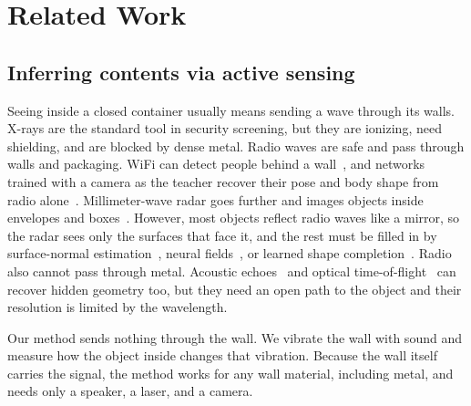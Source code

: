 
\section{Related Work}
\label{sec:related}

\subsection{Inferring contents via active sensing}
Seeing inside a closed container usually means sending a wave through its walls.
X-rays are the standard tool in security screening, but they are ionizing, need shielding, and are blocked by dense metal.
Radio waves are safe and pass through walls and packaging.
WiFi can detect people behind a wall~\cite{adib2013see}, and networks trained with a camera as the teacher recover their pose and body shape from radio alone~\cite{zhao2018rfpose,wang2019personinwifi,geng2022densepose}.
Millimeter-wave radar goes further and images objects inside envelopes and boxes~\cite{ganse2021envelopes,dodds2025mmnorm,lu2026geraf,dodds2025waveformer}.
However, most objects reflect radio waves like a mirror, so the radar sees only the surfaces that face it, and the rest must be filled in by surface-normal estimation~\cite{dodds2025mmnorm}, neural fields~\cite{lu2026geraf}, or learned shape completion~\cite{dodds2025waveformer}.
Radio also cannot pass through metal.
Acoustic echoes~\cite{lindell2019acoustic,christensen2020batvision} and optical time-of-flight~\cite{velten2012recovering} can recover hidden geometry too, but they need an open path to the object and their resolution is limited by the wavelength.

Our method sends nothing through the wall.
We vibrate the wall with sound and measure how the object inside changes that vibration.
Because the wall itself carries the signal, the method works for any wall material, including metal, and needs only a speaker, a laser, and a camera.

